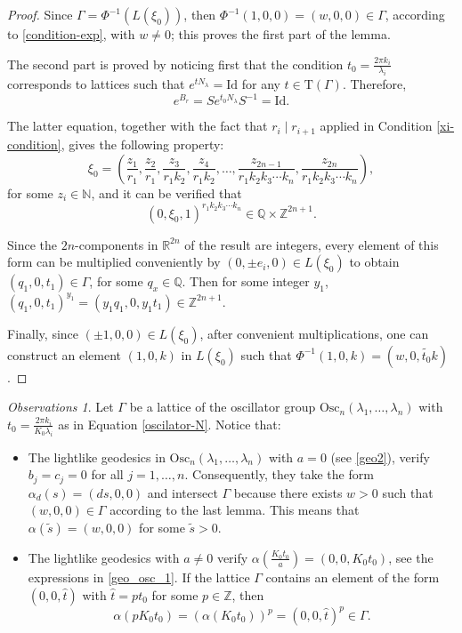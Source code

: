 \documentclass[12pt]{amsart}
\theoremstyle{plain}
\theoremstyle{definition}
\theoremstyle{remark}
\newtheorem{obs}[thm]{Observations}
\begin{document}
\begin{proof}

    Since \( \Gamma = \Phi^{-1}(L(\xi_0)) \), then \( \Phi^{-1}(1,0,0) = (w,0,0) \in \Gamma \), according to \eqref{condition-exp}, with \( w \neq 0 \); this proves the first part of the lemma.
    
    The second part is proved by noticing first that the condition \( t_0 = \frac{2 \pi k_i}{\lambda_i} \) corresponds to lattices such that \( e^{tN_\lambda} = \text{Id} \) for any \( t \in \mathrm{T}(\Gamma) \). Therefore,
    \[
    e^{B_r} = S e^{t_0 N_\lambda} S^{-1} = \text{Id}.
    \]
    
    The latter equation, together with the fact that \( r_i \mid r_{i+1} \) applied in Condition \eqref{xi-condition}, gives the following property:
    \[
    \xi_0 = \left(\frac{z_1}{r_1}, \frac{z_2}{r_1}, \frac{z_3}{r_1 k_2}, \frac{z_4}{r_1 k_2}, \ldots, \frac{z_{2n-1}}{r_1 k_2 k_3 \cdots k_n}, \frac{z_{2n}}{r_1 k_2 k_3 \cdots k_n} \right),
    \]
    for some \( z_i \in \mathbb{N} \), and it can be verified that
    \[
    (0, \xi_0, 1)^{r_1 k_2 k_3 \cdots k_n} \in \mathbb{Q} \times \mathbb{Z}^{2n+1}.
    \]
    
    Since the \( 2n \)-components in \( \mathbb{R}^{2n} \) of the result are integers, every element of this form can be multiplied conveniently by \( (0, \pm e_i, 0) \in L(\xi_0) \) to obtain \( (q_1, 0, t_1) \in \Gamma \), for some \( q_x \in \mathbb{Q} \). Then for some integer \( y_1 \), \( (q_1, 0, t_1)^{y_1} = (y_1 q_1, 0, y_1 t_1) \in \mathbb{Z}^{2n+1} \).
    
    Finally, since \( (\pm 1, 0, 0) \in L(\xi_0) \), after convenient multiplications, one can construct an element \( (1, 0, k) \) in \( L(\xi_0) \) such that \( \Phi^{-1}(1, 0, k) = (w, 0, \widetilde{t_0} k) \).
\end{proof}

\begin{obs}\label{obs-osc}
    Let \( \Gamma \) be a lattice of the oscillator group \( \text{Osc}_n(\lambda_1, \ldots, \lambda_n) \) with \( t_0 = \frac{2\pi k_i}{K_0 \lambda_i} \) as in Equation \eqref{oscilator-N}. Notice that:
    \begin{itemize}
        \item The lightlike geodesics in \( \text{Osc}_n(\lambda_1, \ldots, \lambda_n) \) with \( a = 0 \) (see \eqref{geo2}), verify \( b_j = c_j = 0 \) for all \( j = 1, \ldots, n \). Consequently, they take the form \( \alpha_d(s) = (ds, 0, 0) \) and intersect \( \Gamma \) because there exists \( w > 0 \) such that \( (w, 0, 0) \in \Gamma \) according to the last lemma. This means that \( \alpha(\tilde{s}) = (w, 0, 0) \) for some \( \tilde{s} > 0 \).
        \item The lightlike geodesics with \( a \neq 0 \) verify \( \alpha\left(\frac{K_0 t_0}{a}\right) = (0, 0, K_0 t_0) \), see the expressions in \eqref{geo_osc_1}. If the lattice \( \Gamma \) contains an element of the form \( (0, 0, \hat{t}) \) with \( \hat{t} = p t_0 \) for some \( p \in \mathbb{Z} \), then
        \[
        \alpha(p K_0 t_0) = (\alpha(K_0 t_0))^p = (0, 0, \hat{t})^p \in \Gamma.
        \]
    \end{itemize}
\end{obs}    
\end{document}
